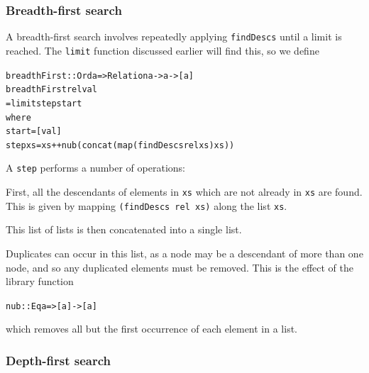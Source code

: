 \subsubsection*{Breadth-first search}

A breadth-first search involves repeatedly applying \texttt{findDescs} until a
limit is reached. The \texttt{limit} function discussed earlier will
find this, so we define
\begin{alltt}
breadthFirst :: Ord a => Relation a -> a -> [a]
breadthFirst rel val
	= limit step start
	  where
	  start = [val]
	  step xs = xs ++ nub (concat (map (findDescs rel xs) xs))
\end{alltt}
A \texttt{step} performs a number of operations:
\begin{titemize}
\item First, all the descendants of
elements in \texttt{xs} which are not already in \texttt{xs} are found. This is given
by mapping \texttt{(findDescs rel xs)} along the list \texttt{xs}.
\item This list of
lists is then concatenated into a single list.  
\item Duplicates can occur
in this list, as a node may be a descendant of more than one node, 
and so any
duplicated elements must be removed. This is the effect of the library
function
\begin{alltt}
nub :: Eq a => [a] -> [a]
\end{alltt}
which removes all but the first
occurrence of each element in a list.
\end{titemize}

\subsubsection*{Depth-first search}

